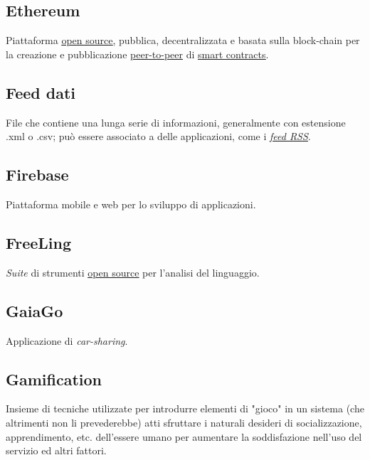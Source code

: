 	\subsection{Ethereum}
	\label{sec:ethereum}
	Piattaforma \underline{\hyperref[sec:opensource]{open source}}, pubblica, decentralizzata e basata sulla block-chain per la creazione e pubblicazione \underline{\hyperref[sec:p2p]{peer-to-peer}} di \underline{\hyperref[sec:smartcontracts]{smart contracts}}.

	\newpage

	\subsection{Feed dati}
	\label{sec:feeddati}
	File che contiene una lunga serie di informazioni, generalmente con estensione .xml o .csv; può essere associato a delle applicazioni, come i \underline{\hyperref[sec:rssfeed]{\emph{feed RSS}}}.

	\subsection{Firebase}
	\label{sec:firebase}
	Piattaforma mobile e web per lo sviluppo di applicazioni.

	\subsection{FreeLing}
	\label{sec:freeling}
	\emph{Suite} di strumenti \underline{\hyperref[sec:opensource]{open source}} per l'analisi del linguaggio.

	\newpage

	
	\subsection{GaiaGo}
	\label{sec:gaiago}
	Applicazione di \emph{car-sharing}.
	
	\subsection{Gamification}
	\label{sec:gamification}
	Insieme di tecniche utilizzate per introdurre elementi di "gioco" in un sistema (che altrimenti non li prevederebbe) atti sfruttare i naturali desideri di socializzazione, apprendimento, etc. dell'essere umano per aumentare la soddisfazione nell'uso del servizio ed altri fattori.
	
